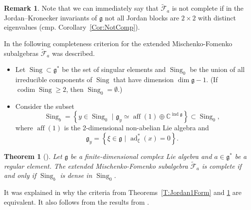 \documentclass[12pt]{article}
\newtheorem{theorem}[lemma]{Theorem}
\theoremstyle{definition}
\newtheorem{remark}[lemma]{Remark}
\begin{document}
\begin{remark} Note that we can immediately say that $\tilde{\mathcal{F}}_a$  is not complete if in the Jordan--Kronecker invariants of $\mathfrak{g}$ not all Jordan blocks are $2 \times 2$ with distinct eigenvalues (cmp. Corollary~\ref{Cor:NotComp}). \end{remark}

In \cite{Izosimov14} the following completeness criterion for the  extended Mischenko-Fomenko subalgebras $\tilde{\mathcal{F}}_a$ was described. 

\begin{itemize}
\item Let $\operatorname{Sing} \subset \mathfrak{g}^*$ be the set of singular elements and $\operatorname{Sing}_0$ be the union of all irreducible components of $\operatorname{Sing}$ that have dimension $\dim \mathfrak{g} -1$. (If $\operatorname{codim} \operatorname{Sing} \geq 2$, then $\operatorname{Sing}_0 = \emptyset$.)

\item Consider the subset
\[ \operatorname{Sing}_b = \left\{ y \in \operatorname{Sing}_0 \, \, \bigr| \,\, \mathfrak{g}_y \simeq  \operatorname{aff}(1) \oplus \mathbb{C}^{\operatorname{ind} \mathfrak{g}} \right\} \subset \operatorname{Sing}_0, \]
 where $\operatorname{aff}(1)$  is the 2-dimensional non-abelian Lie algebra and \[\mathfrak{g}_y = \left\{\xi \in \mathfrak{g} \,\, \bigr| \,\, \operatorname{ad}^*_{\xi} (x) = 0 \right\}.\] 
\end{itemize} 
 
 \begin{theorem}[\cite{Izosimov14}] \label{T:IzosTh} Let $\mathfrak{g}$  be a finite-dimensional complex
Lie algebra and $a \in \mathfrak{g}^*$ be a regular element. The extended Mischenko-Fomenko
subalgebra $\tilde{\mathcal{F}}_a$ is complete if and only if $\operatorname{Sing}_b$ is dense in $\operatorname{Sing}_0$.
\end{theorem}


It was explained in \cite[Section 7]{BolsZhang} why the criteria from Theorems~\ref{T:Jordan1Form} and \ref{T:IzosTh} are equivalent. It also follows from the results from \cite[Section 10.3.2]{Kozlov23JKRealization}.
\end{document}
